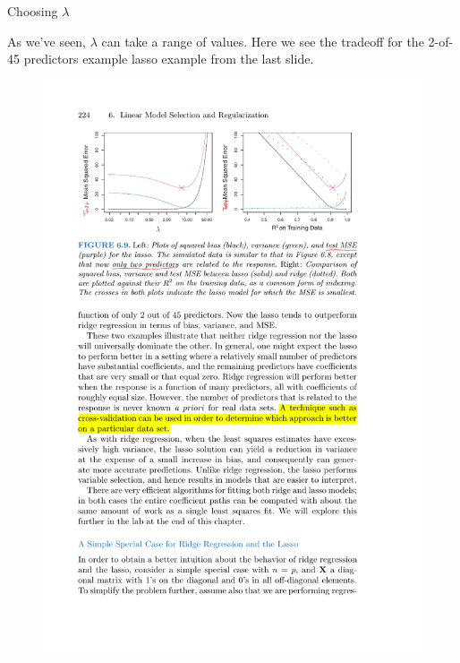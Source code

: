 \documentclass[mathserif, handout, aspectratio=169]{beamer}
\begin{document}
\begin{frame}{Choosing $\lambda$}

As we've seen, $\lambda$ can take a range of values.  Here we see the tradeoff for the 2-of-45 predictors example  lasso example from the last slide. 


\begin{figure}
\includegraphics[scale=.85]{bias-variance-lasso-2}

\end{figure}
\end{frame}
\end{document}
